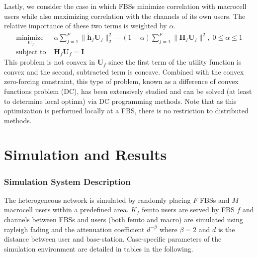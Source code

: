 \par
Lastly, we consider the case in which FBSs minimize correlation with macrocell users while also maximizing correlation with the channels of its own users. The relative importance of these two terms is weighted by $\alpha.$
    \begin{equation}
    \begin{array}{ll}
    \underset{\mathbf{U}_{f} }{\text{minimize }}   & \alpha\sum^F_{f=1} \|\tilde{\mathbf{h}}_{f}  \mathbf{U}_{f}\|^2_2
    -
    (1-\alpha)\sum^F_{f=1} \|\mathbf{H}_{f}  \mathbf{U}_{f}\|^2, \; 0\leq \alpha \leq 1
    \\
    \mbox{subject to } & \mathbf{H}_{f}  \mathbf{U}_{f} = \mathbf{I}
    \end{array}
    \label{e-opt-prob}
    \end{equation}
    This problem is not convex in $\mathbf{U}_{f}$ since the first term of the utility function is convex and the second, subtracted term is concave. Combined with the convex zero-forcing constraint, this type of problem, known as a difference of convex functions problem (DC), has been extensively studied and can be solved (at least to determine local optima) via DC programming methods. Note that as this optimization is performed locally at a FBS, there is no restriction to distributed methods.
     


\chapter{Simulation and Results}\label{numerical}
\subsection{Simulation System Description}
The heterogeneous network is simulated by randomly placing $F$ FBSs and $M$ macrocell users within a predefined area. $K_{f}$ femto users are served by FBS $f$ and channels between FBSs and users (both femto and macro) are simulated using rayleigh fading and the attenuation coefficient $d^{- \beta}$ where $\beta=2$ and $d$ is the distance between user and base-station. Case-specific parameters of the simulation environment are detailed in tables in the following.


